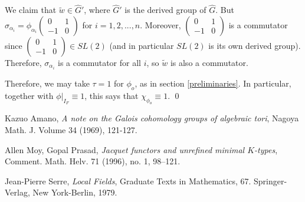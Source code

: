 \documentclass[11pt]{amsart}
\theoremstyle{plain}
\newcommand{\mat}[4]{\left( \begin{array}{cc} {#1} & {#2} \\ {#3} & {#4}
\end{array} \right)}
\begin{document}
We claim that $\tilde{w} \in \hat{G}'$, where $\hat{G}'$ is the derived group of $\hat{G}$.  But $\sigma_{\alpha_i} = \phi_{\alpha_i}\mat{0}{1}{-1}{0}$ for $i = 1, 2, ..., n$.  Moreover, $\mat{0}{1}{-1}{0}$ is a commutator since $\mat{0}{1}{-1}{0} \in SL(2)$ (and in particular $SL(2)$ is its own derived group).  Therefore, $\sigma_{\alpha_i}$ is a commutator for all $i$, so $\tilde{w}$ is also a commutator.

Therefore, we may take $\tau = 1$ for $\phi_o$, as in section \ref{preliminaries}.  In particular, together with $\phi|_{I_F} \equiv 1$, this says that $\chi_{\phi_o} \equiv 1$.
\qed




\begin{thebibliography}{9}

  Kazuo Amano,
  \emph{A note on the Galois cohomology groups of algebraic tori}, Nagoya Math. J. Volume 34 (1969), 121-127.

  Allen Moy, Gopal Prasad,
  \emph{Jacquet functors and unrefined minimal $K$-types},
   Comment. Math. Helv. 71 (1996), no. 1, 98--121.

  Jean-Pierre Serre,
  \emph{Local Fields}, Graduate Texts in Mathematics, 67. Springer-Verlag, New York-Berlin, 1979.

\end{thebibliography}
\end{document}
